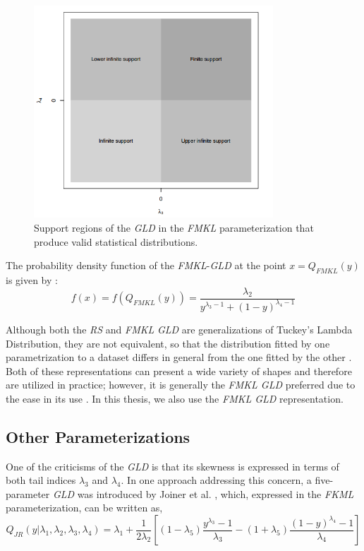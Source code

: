 \begin{figure}[H]
    \centering
    \includegraphics[width=0.8\textwidth]{img/gld/fmkl_regions.png}
    \caption{Support regions of the \textit{GLD} in the \textit{FMKL} parameterization that produce valid statistical
distributions.}
    \label{fig:fmkl_regions}
\end{figure}

The probability density function of the \textit{FMKL}-\textit{GLD} at the point $x=Q_{FMKL}(y)$ is given by \cite{Su2015}:
\begin{equation}\label{eq:fmkl_pdf}
f(x)=f(Q_{FMKL}(y))=\frac{\lambda_{2}}{y^{\lambda_{3}-1}+(1-y)^{\lambda_{4}-1}}
\end{equation}

Although both the \textit{RS} and \textit{FMKL} \textit{GLD} are generalizations of Tuckey's Lambda Distribution, they are not equivalent, so that the distribution fitted by one parametrization to a dataset differs in general from the one fitted by the other \cite{Marcondes2018}. Both of these representations can present a wide variety of shapes and therefore are utilized in practice; however, it is generally the \textit{FMKL GLD} preferred due to the ease in its use \cite{Corlu2016}. In this thesis, we also use the \textit{FMKL GLD} representation.

\subsection{Other Parameterizations}\label{sec:gld_other_param}
One of the criticisms of the \textit{GLD} is that its skewness is expressed in terms of both tail indices $\lambda_{3}$ and $\lambda_{4}$. In one approach addressing this concern, a five-parameter \textit{GLD} was introduced by Joiner et al. \cite{Joiner1971}, which, expressed in the \textit{FKML} parameterization, can be written as,
\begin{equation}\label{eq:jr_param}
Q_{JR}(y|\lambda_{1}, \lambda_{2}, \lambda_{3}, \lambda_{4})=\lambda_{1}+\frac{1}{2 \lambda_{2}}\left[(1-\lambda_{5})\frac{y^{\lambda_{3}}-1}{\lambda_{3}} - (1+\lambda_{5})\frac{(1-y)^{\lambda_{4}}-1}{\lambda_{4}} \right] 
\end{equation}

